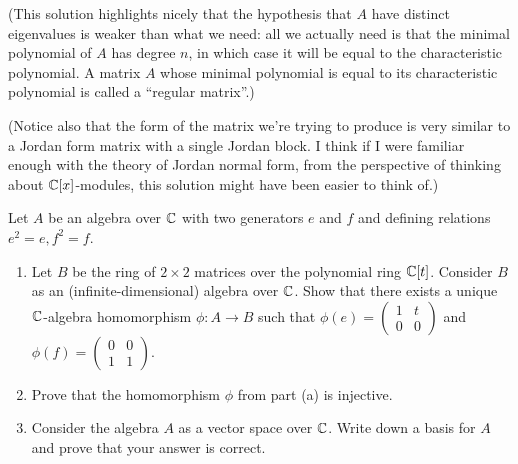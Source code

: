 \begin{solution}
(This solution highlights nicely that the hypothesis that $A$ have distinct eigenvalues is weaker than what we need: all we actually need is that the minimal polynomial of $A$ has degree $n$, in which case it will be equal to the characteristic polynomial. A matrix $A$ whose minimal polynomial is equal to its characteristic polynomial is called a ``regular matrix''.)

(Notice also that the form of the matrix we're trying to produce is very similar to a Jordan form matrix with a single Jordan block. I think if I were familiar enough with the theory of Jordan normal form, from the perspective of thinking about $\mathbb{C}[x]$-modules, this solution might have been easier to think of.)
\end{solution}

%
\begin{question}[subtitle = August 2021 Problem 5,ID=Aug21_5]
Let $A$ be an algebra over $\mathbb{C}$ with two generators $e$ and $f$ and  defining relations $e^2=e,f^2=f$.
\begin{enumerate}
    \item Let $B$ be the ring of $2\times2$ matrices over the polynomial ring $\mathbb{C}[t]$. Consider $B$ as an (infinite-dimensional) algebra over $\mathbb{C}$. Show that there exists a unique $\mathbb{C}$-algebra homomorphism $\phi\colon A \to B$ such that $\phi(e) =\begin{pmatrix} 1 & t\\ 0 & 0\end{pmatrix}$ and $\phi(f) =\begin{pmatrix} 0 & 0\\ 1 & 1\end{pmatrix}$.
    \item Prove that the homomorphism $\phi$ from part (a) is injective.
    \item Consider the algebra $A$ as a vector space over $\mathbb{C}$. Write down a basis for $A$ and prove that your answer is correct.
\end{enumerate}
\end{question}
